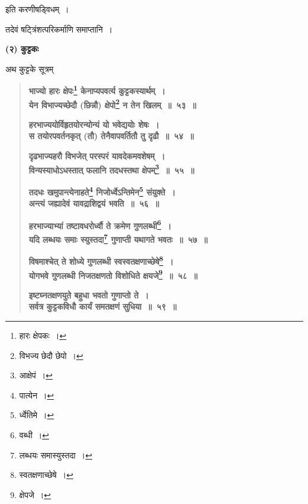 \documentclass[11pt, openany]{book}
\begin{document}
\begin{center}
इति करणीषड्विधम्~।
\vspace{4mm}

तदेवं षट्त्रिंशत्परिकर्माणि समाप्तानि~।
\end{center}

\newpage

 \label{kut}
\begin{center}
\textbf{(२) कुट्टकः}
\end{center}

अथ कुट्टके सूत्रम् \textendash 

 \label{53}
\begin{quote}
\textbf{{\color{purple}भाज्यो हारः क्षेपः\renewcommand{\thefootnote}{१}\footnote{हारः क्षेपकः~।} केनाप्यपवर्त्य कुट्टकस्यार्थम्~। \\
येन विभाज्यच्छेदौ (छिन्नौ) क्षेपो\renewcommand{\thefootnote}{२}\footnote{विभज्य छेदौ छेपो~।} न तेन खिलम्~॥~५३~॥}}
\vspace{1mm}

 \label{54}
\textbf{{\color{purple}हरभाज्ययोर्विहृतयोरन्योन्यं यो भवेद्ययोः शेषः~। \\
स तयोरपवर्तनकृत् (तौ) तेनैवापवर्तितौ तु दृढौ~॥~५४~॥}}
\vspace{1mm}

\textbf{{\color{purple}दृढभाज्यहरौ विभजेत् परस्परं यावदेकमवशेषम्~। \\
विन्यस्याधोऽधस्तात् फलानि तदधस्तथा क्षेपम्\renewcommand{\thefootnote}{३}\footnote{आक्षेपं~।}~॥~५५~॥}}
\vspace{1mm}

\textbf{{\color{purple}तदधः खमुपान्त्येनाहते\renewcommand{\thefootnote}{४}\footnote{पात्येन~।} निजोर्ध्वेऽन्तिमेन\renewcommand{\thefootnote}{५}\footnote{र्ध्वेतिमे~।} संयुक्ते~। \\
अन्त्यं जह्यादेवं यावद्राशिद्वयं भवति~॥~५६~॥}}
\vspace{1mm}

\textbf{{\color{purple}हरभाज्याभ्यां तष्टावधरोर्ध्वौ ते क्रमेण गुणलब्धी\renewcommand{\thefootnote}{६}\footnote{वब्धी~।}~। \\
यदि लब्धयः समाः स्युस्तदा\renewcommand{\thefootnote}{७}\footnote{लब्धयः समास्युस्तदा~।} गुणाप्ती यथागते भवतः~॥~५७~॥}}
\vspace{1mm}

\textbf{{\color{purple}विषमाश्चेत् ते शोध्ये गुणलब्धी स्वस्वतक्षणाच्छेषे\renewcommand{\thefootnote}{८}\footnote{स्वतक्षणाच्छेषे~।}~। \\
योगभवे गुणलब्धी निजतक्षणतो विशोधिते क्षयजे\renewcommand{\thefootnote}{९}\footnote{क्षेपजे~।}~॥~५८~॥}}
\vspace{1mm}

 \label{59}
\textbf{{\color{purple}इष्टघ्नतक्षणयुते बहुधा भवतो गुणाप्तो ते~। \\
सर्वत्र कुट्टकविधौ कार्यं समतक्षणं सुधिया~॥~५९~॥}}
\end{quote}
\end{document}
